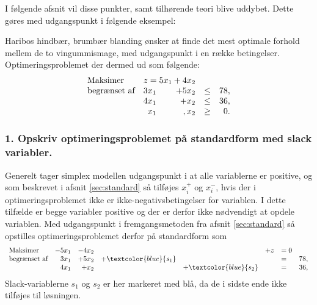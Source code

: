 \noindent
%
I følgende afsnit vil disse punkter, samt tilhørende teori blive uddybet. 
Dette gøres med udgangspunkt i følgende eksempel: 
%
\\
%
\begin{eks}
\label{haribooooo}
%
Haribos hindbær, brumbær blanding ønsker at finde det mest optimale forhold mellem de to vingummismage, med udgangspunkt i en række betingelser. 
Optimeringsproblemet der dermed ud som følgende:
%
\begin{align*}
\begin{array}{lrrlr}
\text{Maksimer}		&	\multicolumn{2}{c}{z=5x_1+4x_2}  &\\
\text{begrænset af}	&3x_1& +5x_2			&\leq 	&78,\\
					&4x_1& + x_2				&\leq	& 36,\\
					&x_1& , x_2				&\geq	& 0.
\end{array}
\end{align*}
%
\end{eks}

\subsubsection{1. Opskriv optimeringsproblemet på standardform med slack variabler.}
%
Generelt tager simplex modellen udgangspunkt i at alle variablerne er positive, og som beskrevet i afsnit \ref{sec:standard} så tilføjes $x_i^+$ og $x_i^-$, hvis der i optimeringsproblemet ikke er ikke-negativsbetingelser for variablen. 
I dette tilfælde er begge variabler positive og der er derfor ikke nødvendigt at opdele variablen. 
Med udgangspunkt i fremgangsmetoden fra afsnit \ref{sec:standard} så opstilles optimeringsproblemet derfor på standardform som
%
\begin{align*}
\begin{array}{lrrrrrlr}
\text{Maksimer}		& -5x_1 &-4x_2 &&& + z & =0\\
\text{begrænset af}	&3x_1& +5x_2	& + \textcolor{blue}{s_1} 	&&&= 	&78,\\
					&4x_1& + x_2	& & + \textcolor{blue}{s_2}	&&=	&	 36,\\
\end{array}
\end{align*}
%
Slack-variablerne $s_1$ og $s_2$ er her markeret med blå, da de i sidste ende ikke tilføjes til løsningen. 
%
